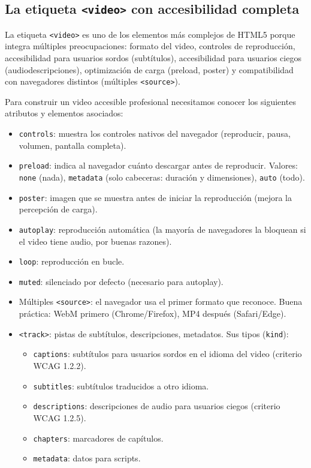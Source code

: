 \subsection{La etiqueta \texttt{<video>} con accesibilidad completa}

La etiqueta \texttt{<video>} es uno de los elementos más complejos
de HTML5 porque integra múltiples preocupaciones: formato del video,
controles de reproducción, accesibilidad para usuarios sordos
(subtítulos), accesibilidad para usuarios ciegos (audiodescripciones),
optimización de carga (preload, poster) y compatibilidad con navegadores
distintos (múltiples \texttt{<source>}).

Para construir un video accesible profesional necesitamos conocer
los siguientes atributos y elementos asociados:

\begin{itemize}
\item \texttt{controls}: muestra los controles nativos del navegador
(reproducir, pausa, volumen, pantalla completa).
\item \texttt{preload}: indica al navegador cuánto descargar antes de
reproducir. Valores: \texttt{none} (nada), \texttt{metadata}
(solo cabeceras: duración y dimensiones), \texttt{auto} (todo).
\item \texttt{poster}: imagen que se muestra antes de iniciar la
reproducción (mejora la percepción de carga).
\item \texttt{autoplay}: reproducción automática (la mayoría de
navegadores la bloquean si el video tiene audio, por buenas
razones).
\item \texttt{loop}: reproducción en bucle.
\item \texttt{muted}: silenciado por defecto (necesario para
autoplay).
\item Múltiples \texttt{<source>}: el navegador usa el primer formato
que reconoce. Buena práctica: WebM primero (Chrome/Firefox), MP4
después (Safari/Edge).
\item \texttt{<track>}: pistas de subtítulos, descripciones,
metadatos. Sus tipos (\texttt{kind}):
   \begin{itemize}
   \item \texttt{captions}: subtítulos para usuarios sordos en el
   idioma del video (criterio WCAG 1.2.2).
   \item \texttt{subtitles}: subtítulos traducidos a otro idioma.
   \item \texttt{descriptions}: descripciones de audio para usuarios
   ciegos (criterio WCAG 1.2.5).
   \item \texttt{chapters}: marcadores de capítulos.
   \item \texttt{metadata}: datos para scripts.
   \end{itemize}
\end{itemize}

